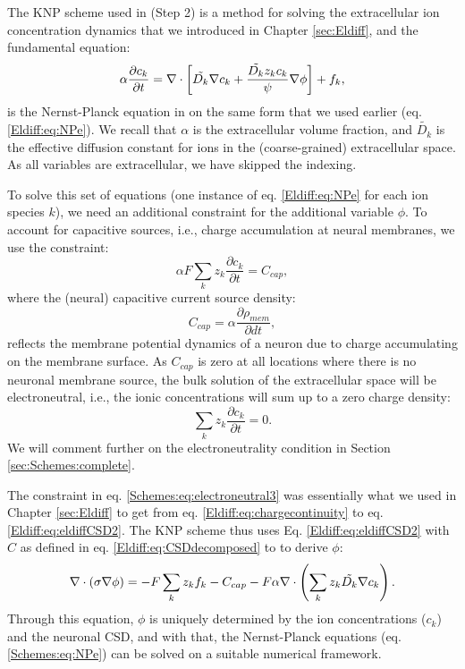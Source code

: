The KNP scheme used in (Step 2) is a method for solving the extracellular ion concentration dynamics that we introduced in Chapter \ref{sec:Eldiff}, and the fundamental equation: 
\begin{equation}
\alpha \frac{\partial c_k}{\partial t} = {\bf \nabla} \cdot \left[ \tilde{D_k} {\bf \nabla} c_k + \frac{\tilde{D_k} z_k c_k}{\psi} {\bf \nabla} \phi \right] + f_k,
\label{Schemes:eq:NPe}
\end{equation}
is the Nernst-Planck equation in on the same form that we used earlier (eq. \ref{Eldiff:eq:NPe}). We recall that $\alpha$ is the extracellular volume fraction, and $\tilde{D_k}$ is the effective diffusion constant for ions in the (coarse-grained) extracellular space. As all variables are extracellular, we have skipped the indexing. 

To solve this set of equations (one instance of eq. \ref{Eldiff:eq:NPe} for each ion species $k$), we need an additional constraint for the additional variable $\phi$. To account for capacitive sources, i.e., charge accumulation at neural membranes, we use the constraint:
\begin{equation}
\alpha F \sum_k{z_k \frac{\partial c_k}{\partial t}} = C_{cap},
\label{Schemes:eq:electroneutral3}
\end{equation}
where the (neural) capacitive current source density:
\begin{equation}
C_{cap} = {\alpha}\frac{\partial \rho_{mem}}{\partial dt},
\label{Schemes:eq:Andreas}
\end{equation}
reflects the membrane potential dynamics of a neuron due to charge accumulating on the membrane surface. As $C_{cap}$ is zero at all locations where there is no neuronal membrane source, the bulk solution of the extracellular space will be electroneutral, i.e., the ionic concentrations will sum up to a zero charge density:
\begin{equation}
\sum_k{z_k \frac{\partial c_k}{\partial t}} = 0.
\label{Schemes:eq:electroneutral4}
\end{equation}
We will comment further on the electroneutrality condition in Section \ref{sec:Schemes:complete}.

The constraint in eq. \ref{Schemes:eq:electroneutral3} was essentially what we used in Chapter \ref{sec:Eldiff} to get from eq. \ref{Eldiff:eq:chargecontinuity} to eq. \ref{Eldiff:eq:eldiffCSD2}. The KNP scheme thus uses Eq. \ref{Eldiff:eq:eldiffCSD2} with $C$ as defined in eq.  \ref{Eldiff:eq:CSDdecomposed} to to derive $\phi$:
\begin{equation}
\nabla \cdot (\sigma\nabla\phi) = - F \sum_k z_k f_k -  C_{cap} - F\alpha \nabla \cdot \left (\sum_k{z_k \tilde{D_k}{\bf \nabla} c_{k}} \right).
\label{Schemes:eq:KNPfinal}
\end{equation}
Through this equation, $\phi$ is uniquely determined by the ion concentrations ($c_k$) and the neuronal CSD, and with that, the Nernst-Planck equations (eq. \ref{Schemes:eq:NPe}) can be solved on a suitable numerical framework.


